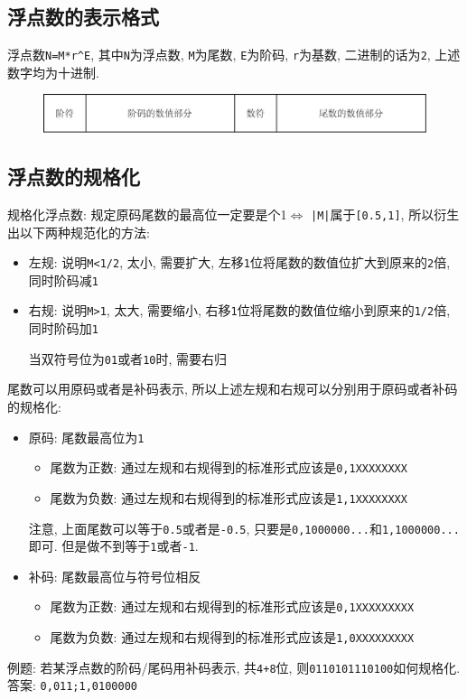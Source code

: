 \subsection{浮点数的表示格式}
浮点数\verb|N=M*r^E|, 其中\verb|N|为浮点数, \verb|M|为尾数, \verb|E|为阶码, \verb|r|为基数, 二进制的话为\verb|2|, 上述数字均为十进制.
\begin{figure}[H]
\centering
\includegraphics[scale=.7]{img/figure9.pdf}
\end{figure}
\subsection{浮点数的规格化}
规格化浮点数: 规定原码尾数的最高位一定要是个1$ \Leftrightarrow $ \texttt{|M|}属于\verb|[0.5,1]|, 所以衍生出以下两种规范化的方法:
\begin{itemize}
\item 左规: 说明\texttt{M<1/2}, 太小, 需要扩大, 左移\verb|1|位将尾数的数值位扩大到原来的\verb|2|倍, 同时阶码减\verb|1|
\item 右规: 说明\texttt{M>1}, 太大, 需要缩小, 右移\verb|1|位将尾数的数值位缩小到原来的\verb|1/2|倍, 同时阶码加\verb|1|\par 当双符号位为\verb|01|或者\verb|10|时, 需要右归
\end{itemize}\par
尾数可以用原码或者是补码表示, 所以上述左规和右规可以分别用于原码或者补码的规格化:
\begin{itemize}
\item 原码: 尾数最高位为\verb|1|
\begin{itemize}
\item 尾数为正数: 通过左规和右规得到的标准形式应该是\verb|0,1XXXXXXXX|
\item 尾数为负数: 通过左规和右规得到的标准形式应该是\verb|1,1XXXXXXXX|
\end{itemize}\par
注意, 上面尾数可以等于\verb|0.5|或者是\verb|-0.5|, 只要是\verb|0,1000000...|和\verb|1,1000000...|即可. 但是做不到等于\verb|1|或者\verb|-1|.
\item 补码: 尾数最高位与符号位相反
\begin{itemize}
\item 尾数为正数: 通过左规和右规得到的标准形式应该是\verb|0,1XXXXXXXXX|
\item 尾数为负数: 通过左规和右规得到的标准形式应该是\verb|1,0XXXXXXXXX|
\end{itemize}
\end{itemize}\par
例题: 若某浮点数的阶码/尾码用补码表示, 共\verb|4+8|位, 则\verb|0110101110100|如何规格化. 答案: \verb|0,011;1,0100000|
